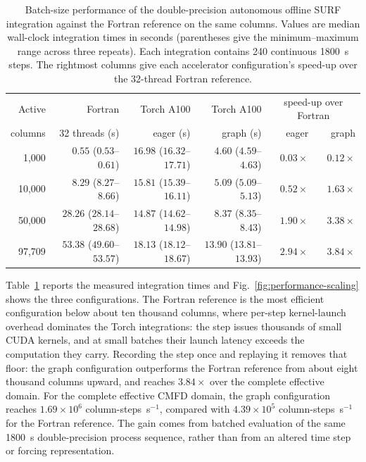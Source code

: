 \begin{table}[t]
\caption{Batch-size performance of the double-precision autonomous offline
SURF integration against the Fortran reference on the same columns. Values
are median wall-clock integration times in seconds (parentheses give the
minimum--maximum range across three repeats). Each integration contains 240
continuous 1800~s steps. The rightmost columns give each accelerator
configuration's speed-up over the 32-thread Fortran reference.}
\label{tab:performance-scaling}
\centering
\small
\begin{tabular}{rrrrrr}
\hline
Active & Fortran & Torch A100 & Torch A100 & \multicolumn{2}{c}{speed-up over Fortran} \\
columns & 32 threads (s) & eager (s) & graph (s) & eager & graph \\
\hline
1,000 & $0.55$ ($0.53$--$0.61$) & $16.98$ ($16.32$--$17.71$) & $4.60$ ($4.59$--$4.63$) & $0.03\times$ & $0.12\times$ \\
10,000 & $8.29$ ($8.27$--$8.66$) & $15.81$ ($15.39$--$16.11$) & $5.09$ ($5.09$--$5.13$) & $0.52\times$ & $1.63\times$ \\
50,000 & $28.26$ ($28.14$--$28.68$) & $14.87$ ($14.62$--$14.98$) & $8.37$ ($8.35$--$8.43$) & $1.90\times$ & $3.38\times$ \\
97,709 & $53.38$ ($49.60$--$53.57$) & $18.13$ ($18.12$--$18.67$) & $13.90$ ($13.81$--$13.93$) & $2.94\times$ & $3.84\times$ \\
\hline
\end{tabular}
\end{table}

Table~\ref{tab:performance-scaling} reports the measured integration times
and Fig.~\ref{fig:performance-scaling} shows the three configurations. The
Fortran reference is the most efficient configuration below about ten
thousand columns, where per-step kernel-launch overhead dominates the Torch
integrations: the step issues thousands of small CUDA kernels, and at small
batches their launch latency exceeds the computation they carry. Recording
the step once and replaying it removes that floor: the graph configuration
outperforms the Fortran reference from about eight thousand columns upward,
and reaches $3.84\times$ over the complete effective domain. For the complete
effective CMFD domain, the graph configuration reaches
$1.69\times10^{6}$ column-steps~s$^{-1}$, compared with
$4.39\times10^{5}$ column-steps~s$^{-1}$ for the Fortran reference. The gain
comes from batched evaluation of the same 1800~s double-precision process
sequence, rather than from an altered time step or forcing representation.

